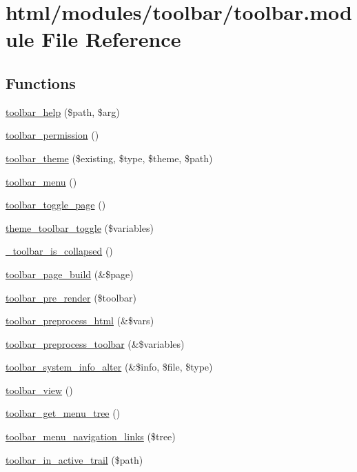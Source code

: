 \hypertarget{toolbar_8module}{
\section{html/modules/toolbar/toolbar.module File Reference}
\label{toolbar_8module}
}
\subsection*{Functions}
\begin{DoxyCompactItemize}
\item 
\hyperlink{toolbar_8module_a9767153f4d8af0ed3c0a8e5d236c45be}{toolbar\_\-help} (\$path, \$arg)
\item 
\hyperlink{toolbar_8module_af222824d9b7a9d28cd33800a9f2afea5}{toolbar\_\-permission} ()
\item 
\hyperlink{toolbar_8module_aa7b0064fb9c544ae3adb8813dd3019a0}{toolbar\_\-theme} (\$existing, \$type, \$theme, \$path)
\item 
\hyperlink{toolbar_8module_a3d6ba4473eecb99377495528080de652}{toolbar\_\-menu} ()
\item 
\hyperlink{toolbar_8module_a84504c00fcc9385a1ee4aff32d51266d}{toolbar\_\-toggle\_\-page} ()
\item 
\hyperlink{toolbar_8module_a14011de2326542fa3b7a2af854a774e5}{theme\_\-toolbar\_\-toggle} (\$variables)
\item 
\hyperlink{toolbar_8module_a4d55010e43540bac5da868dee270feaa}{\_\-toolbar\_\-is\_\-collapsed} ()
\item 
\hyperlink{toolbar_8module_ad5fcbe045bc4142d508108741ffe7b18}{toolbar\_\-page\_\-build} (\&\$page)
\item 
\hyperlink{toolbar_8module_a17db359a6a69c506729e38ab314a8b6a}{toolbar\_\-pre\_\-render} (\$toolbar)
\item 
\hyperlink{toolbar_8module_a2f497353c742b38175aab2bbedf75ee0}{toolbar\_\-preprocess\_\-html} (\&\$vars)
\item 
\hyperlink{toolbar_8module_aec79d6b1e77e3d99e8d250caf9e5615d}{toolbar\_\-preprocess\_\-toolbar} (\&\$variables)
\item 
\hyperlink{toolbar_8module_a6aea9fd1fb8df058eb4df4a7cb77d43e}{toolbar\_\-system\_\-info\_\-alter} (\&\$info, \$file, \$type)
\item 
\hyperlink{toolbar_8module_a36f95831ad601605940061ff8a51d8f4}{toolbar\_\-view} ()
\item 
\hyperlink{toolbar_8module_abe825f7b728aa4d86fd8326f6b5417ee}{toolbar\_\-get\_\-menu\_\-tree} ()
\item 
\hyperlink{toolbar_8module_a42f64eec2db73a6bcf05b1301509dd91}{toolbar\_\-menu\_\-navigation\_\-links} (\$tree)
\item 
\hyperlink{toolbar_8module_ae0f25c4df3fe3bc3fa83bc0bdd3a8606}{toolbar\_\-in\_\-active\_\-trail} (\$path)
\end{DoxyCompactItemize}


